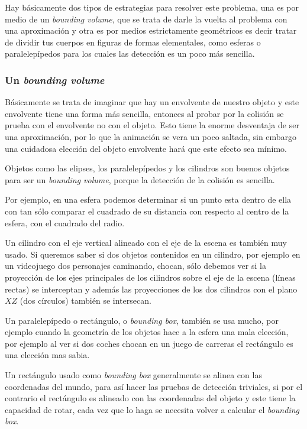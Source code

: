 Hay básicamente dos tipos de estrategias para resolver este problema, una es por medio de un \foreignlanguage{english}{\emph{bounding volume}}, que se trata de darle la vuelta al problema con una aproximación y otra es por medios estrictamente geométricos es decir tratar de dividir tus cuerpos en figuras de formas elementales, como esferas o paralelepípedos para los cuales las detección es un poco más sencilla.

\subsubsection{Un \foreignlanguage{english}{\emph{bounding volume}}}
Básicamente se trata de imaginar que hay un envolvente de nuestro objeto y este envolvente tiene una forma más sencilla, entonces al probar por la colisión se prueba con el envolvente no con el objeto.
Esto tiene la enorme desventaja de ser una aproximación, por lo que la animación se vera un poco saltada, sin embargo una cuidadosa elección del objeto envolvente hará que este efecto sea mínimo.

Objetos como las elipses, los paralelepípedos y los cilindros son buenos objetos para ser un \foreignlanguage{english}{\emph{bounding volume}}, porque la detección de la colisión es sencilla.

Por ejemplo, en una esfera podemos determinar si un punto esta dentro de ella con tan sólo comparar el cuadrado de su distancia con respecto al centro de la esfera, con el cuadrado del radio. 

Un cilindro con el eje vertical alineado con el eje de la escena es también muy usado.
Si queremos saber si dos objetos contenidos en un cilindro, por ejemplo en un videojuego dos personajes caminando, chocan, sólo debemos ver si la proyección de los ejes principales de los cilindros sobre el eje de la escena (líneas rectas) se interceptan y además las proyecciones de los dos cilindros con el plano $XZ$ (dos círculos) también se intersecan.

Un paralelepípedo o rectángulo, o \foreignlanguage{english}{\emph{bounding box}}, también se usa mucho, por ejemplo cuando la geometría de los objetos hace a la esfera una mala elección, por ejemplo al ver si dos coches chocan en un juego de carreras el rectángulo es una elección mas sabia.

Un rectángulo usado como \foreignlanguage{english}{\emph{bounding box}} generalmente se alinea con las coordenadas del mundo, para así hacer las pruebas de detección triviales, si  por el contrario el rectángulo es alineado con las coordenadas del objeto y este tiene la capacidad de rotar, cada vez que lo haga se necesita volver a calcular el  \foreignlanguage{english}{\emph{bounding box}}.
